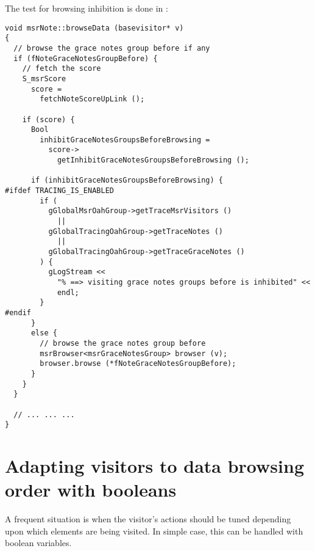 The test for browsing inhibition is done in :
\begin{lstlisting}[language=CPlusPlus]
void msrNote::browseData (basevisitor* v)
{
  // browse the grace notes group before if any
  if (fNoteGraceNotesGroupBefore) {
    // fetch the score
    S_msrScore
      score =
        fetchNoteScoreUpLink ();

    if (score) {
      Bool
        inhibitGraceNotesGroupsBeforeBrowsing =
          score->
            getInhibitGraceNotesGroupsBeforeBrowsing ();

      if (inhibitGraceNotesGroupsBeforeBrowsing) {
#ifdef TRACING_IS_ENABLED
        if (
          gGlobalMsrOahGroup->getTraceMsrVisitors ()
            ||
          gGlobalTracingOahGroup->getTraceNotes ()
            ||
          gGlobalTracingOahGroup->getTraceGraceNotes ()
        ) {
          gLogStream <<
            "% ==> visiting grace notes groups before is inhibited" <<
            endl;
        }
#endif
      }
      else {
        // browse the grace notes group before
        msrBrowser<msrGraceNotesGroup> browser (v);
        browser.browse (*fNoteGraceNotesGroupBefore);
      }
    }
  }

  // ... ... ...
}
\end{lstlisting}


\section{Adapting visitors to data browsing order with booleans}

A frequent situation is when the visitor's actions should be tuned depending upon which elements are being visited. In simple case, this can be handled with boolean variables.

